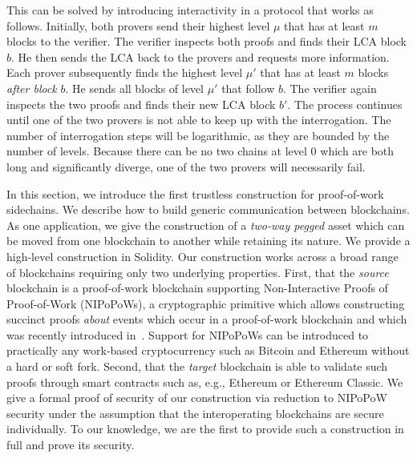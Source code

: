 This can be solved by introducing interactivity in a protocol that works as
follows. Initially, both provers send their highest level $\mu$ that has at
least $m$ blocks to the verifier. The verifier inspects both proofs and finds
their LCA block $b$. He then sends the LCA back to the provers and requests more
information. Each prover subsequently finds the highest level $\mu'$ that has at
least $m$ blocks \emph{after block} $b$. He sends all blocks of level $\mu'$ that
follow $b$. The verifier again inspects the two
proofs and finds their new LCA block $b'$. The process continues until one of the
two provers is not able to keep up with the interrogation. The number of
interrogation steps will be logarithmic, as they are bounded by the number of
levels. Because there can be
no two chains at level $0$ which are both long and significantly diverge, one of
the two provers will necessarily fail.


\ifdraft
{}
In this section, we introduce the first
trustless construction for proof-of-work sidechains. We describe how to build
generic communication between blockchains. As one application, we give the
construction of a \emph{two-way pegged} asset which can be moved from one
blockchain to another while retaining its nature. We provide a high-level
construction in Solidity. Our construction works across a broad range of
blockchains requiring only two underlying properties. First, that the
\emph{source} blockchain is a proof-of-work blockchain supporting
Non-Interactive Proofs of Proof-of-Work (NIPoPoWs), a cryptographic primitive
which allows constructing succinct proofs \emph{about} events which occur in a
proof-of-work blockchain and which was recently introduced in~\cite{nipopows}.
Support for NIPoPoWs can be introduced to practically any
work-based cryptocurrency such as Bitcoin and Ethereum without a hard or soft
fork. Second, that the \emph{target} blockchain is able to validate such proofs
through smart contracts such as, e.g., Ethereum or Ethereum
Classic.
We give a formal proof of security of our construction via
reduction to NIPoPoW security under the assumption that the interoperating
blockchains are secure individually.
To our knowledge, we are the first to
provide such a construction in
full and prove its security.
\fi

